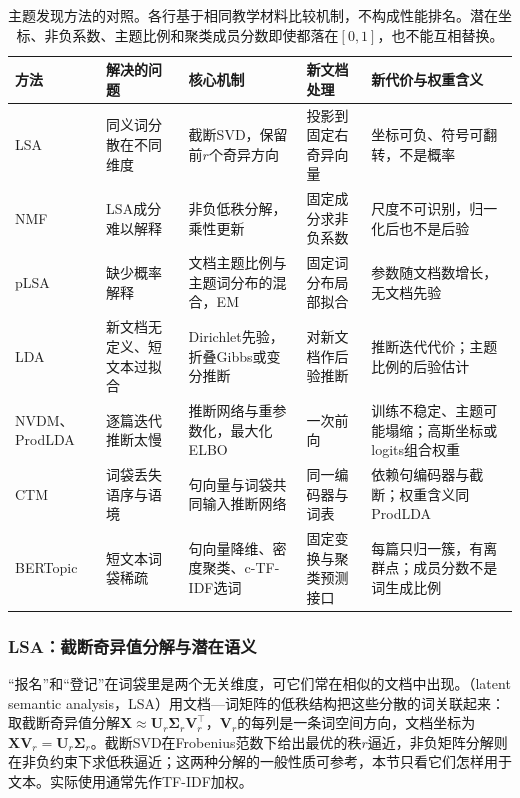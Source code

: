 \begin{table}[htbp]
 \centering
 \begin{tabularx}{\linewidth}{@{}>{\raggedright\arraybackslash}p{17mm}
   >{\raggedright\arraybackslash}p{30mm}>{\raggedright\arraybackslash}X
   >{\raggedright\arraybackslash}p{30mm}>{\raggedright\arraybackslash}X@{}}
  \toprule
  方法 & 解决的问题 & 核心机制 & 新文档处理 & 新代价与权重含义 \\
  \midrule
  LSA & 同义词分散在不同维度 & 截断SVD，保留前$r$个奇异方向 & 投影到固定右奇异向量 & 坐标可负、符号可翻转，不是概率 \\
  NMF & LSA成分难以解释 & 非负低秩分解，乘性更新 & 固定成分求非负系数 & 尺度不可识别，归一化后也不是后验 \\
  pLSA & 缺少概率解释 & 文档主题比例与主题词分布的混合，EM & 固定词分布局部拟合 & 参数随文档数增长，无文档先验 \\
  LDA & 新文档无定义、短文本过拟合 & Dirichlet先验，折叠Gibbs或变分推断 & 对新文档作后验推断 & 推断迭代代价；主题比例的后验估计 \\
  NVDM、ProdLDA & 逐篇迭代推断太慢 & 推断网络与重参数化，最大化ELBO & 一次前向 & 训练不稳定、主题可能塌缩；高斯坐标或logits组合权重 \\
  CTM & 词袋丢失语序与语境 & 句向量与词袋共同输入推断网络 & 同一编码器与词表 & 依赖句编码器与截断；权重含义同ProdLDA \\
  BERTopic & 短文本词袋稀疏 & 句向量降维、密度聚类、c-TF-IDF选词 & 固定变换与聚类预测接口 & 每篇只归一簇，有离群点；成员分数不是词生成比例 \\
  \bottomrule
 \end{tabularx}
 \caption{主题发现方法的对照。各行基于相同教学材料比较机制，不构成性能排名。潜在坐标、非负系数、主题比例和聚类成员分数即使都落在$[0,1]$，也不能互相替换。}
 \label{tab:nlp-classification-topic-methods}
\end{table}

\FloatBarrier
\subsubsection{LSA：截断奇异值分解与潜在语义}
\label{sec:nlp-classification-lsa}

“报名”和“登记”在词袋里是两个无关维度，可它们常在相似的文档中出现。（latent semantic analysis，LSA）用文档—词矩阵的低秩结构把这些分散的词关联起来：取截断奇异值分解$\bm X\approx\bm U_r\bm\Sigma_r\bm V_r^\top$，$\bm V_r$的每列是一条词空间方向，文档坐标为$\bm X\bm V_r=\bm U_r\bm\Sigma_r$。截断SVD在Frobenius范数下给出最优的秩$r$逼近，非负矩阵分解则在非负约束下求低秩逼近；这两种分解的一般性质可参考，本节只看它们怎样用于文本。实际使用通常先作TF-IDF加权。

